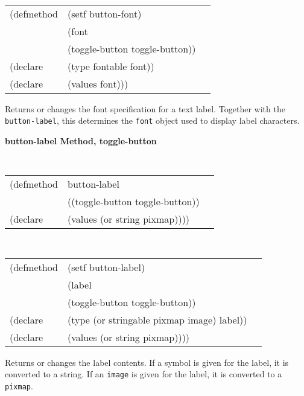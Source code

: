 \begin{flushright} \parbox[t]{6.125in}{
\tt
\begin{tabular}{lll}
\raggedright
(defmethod & (setf button-font) & \\
         & (font \\
         & (toggle-button  toggle-button)) \\
(declare &(type fontable  font))\\
(declare & (values font)))
\end{tabular}
\rm}
\end{flushright}

\begin{flushright} \parbox[t]{6.125in}{
Returns or changes the font specification for a text label. Together
with the {\tt button-label}, this determines the {\tt font}
object used to display label characters.
}
\end{flushright}




{\samepage  
{\large {\bf button-label \hfill Method, toggle-button}}
\begin{flushright} \parbox[t]{6.125in}{
\tt
\begin{tabular}{lll}
\raggedright
(defmethod & button-label & \\
& ((toggle-button  toggle-button)) \\
(declare & (values (or string pixmap))))
\end{tabular}
\rm

}\end{flushright}}

\begin{flushright} \parbox[t]{6.125in}{
\tt
\begin{tabular}{lll}
\raggedright
(defmethod & (setf button-label) & \\
         & (label \\
         & (toggle-button  toggle-button)) \\
(declare &(type (or stringable pixmap image)  label))\\
(declare & (values (or string pixmap))))
\end{tabular}
\rm}
\end{flushright}

\begin{flushright} \parbox[t]{6.125in}{
Returns or changes the label contents. If a symbol is given for the label, it is
converted to a string. If an {\tt image} is given for the label, it is converted
to a {\tt pixmap}.}
\end{flushright}

